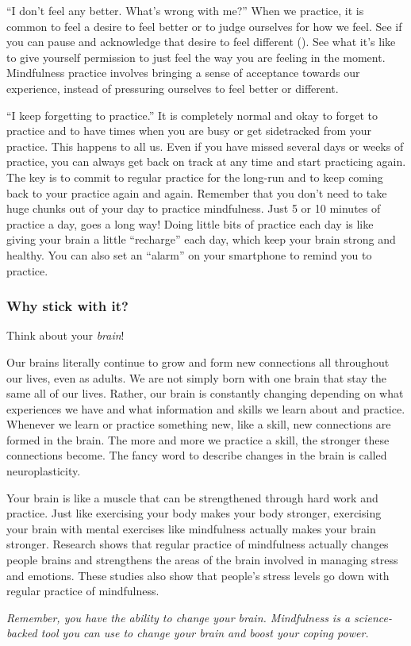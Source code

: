 \begin{description*}
		\item[“I don’t feel any better. What’s wrong with me?”] When we practice, it is common to feel a desire to feel better or to judge ourselves for how we feel. See if you can pause and acknowledge that desire to feel different (). See what it’s like to give yourself permission to just feel the way you are feeling in the moment. Mindfulness practice involves bringing a sense of acceptance towards our experience, instead of pressuring ourselves to feel better or different.
		\item[“I keep forgetting to practice.”] It is completely normal and okay to forget to practice and to have times when you are busy or get sidetracked from your practice. This happens to all us. Even if you have missed several days or weeks of practice, you can always get back on track at any time and start practicing again. The key is to commit to regular practice for the long-run and to keep coming back to your practice again and again. Remember that you don’t need to take huge chunks out of your day to practice mindfulness. Just 5 or 10 minutes of practice a day, goes a long way! Doing little bits of practice each day is like giving your brain a little “recharge” each day, which keep your brain strong and healthy. You can also set an “alarm” on your smartphone to remind you to practice.
	\end{description*}
\egroup

\subsubsection*{Why stick with it?}
	Think about your \emph{brain}!
	\begin{description*}
		\item[Our brains literally continue to grow and form new connections all throughout our lives,] even as adults. We are not simply born with one brain that stay the same all of our lives. Rather, our brain is constantly changing depending on what experiences we have and what information and skills we learn about and practice. Whenever we learn or practice something new, like a skill, new connections are formed in the brain. The more and more we practice a skill, the stronger these connections become. The fancy word to describe changes in the brain is called neuroplasticity.
		\item[Your brain is like a muscle that can be strengthened through hard work and practice.] Just like exercising your body makes your body stronger, exercising your brain with mental exercises like mindfulness actually makes your brain stronger. Research shows that regular practice of mindfulness actually changes people brains and strengthens the areas of the brain involved in managing stress and emotions. These studies also show that people’s stress levels go down with regular practice of mindfulness.
	\end{description*}
	\emph{Remember, you have the ability to change your brain. Mindfulness is a science-backed tool you can use to change your brain and boost your coping power.}
